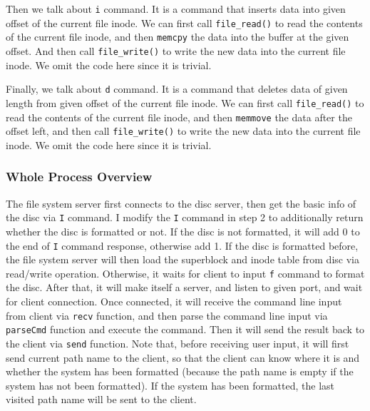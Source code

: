 Then we talk about \texttt{i} command. It is a command that inserts data into given offset of the current file inode. 
We can first call \texttt{file\_read()} to read the contents of the current file inode, and then \texttt{memcpy} the data into the buffer at the given offset. And then call \texttt{file\_write()} to write the new data into the current file inode. 
We omit the code here since it is trivial.

Finally, we talk about \texttt{d} command. It is a command that deletes data of given length from given offset of the current file inode.
We can first call \texttt{file\_read()} to read the contents of the current file inode, and then \texttt{memmove} the data after the offset left, and then call \texttt{file\_write()} to write the new data into the current file inode.
We omit the code here since it is trivial.

\subsubsection{Whole Process Overview}
The file system server first connects to the disc server, then get the basic info of the disc via \texttt{I} command. I modify the \texttt{I} command in step 2 to additionally return whether the disc is formatted or not.
If the disc is not formatted, it will add 0 to the end of \texttt{I} command response, otherwise add 1.
If the disc is formatted before, the file system server will then load the superblock and inode table from disc via read/write operation.
Otherwise, it waits for client to input \texttt{f} command to format the disc. After that, it will make itself a server, and listen to given port, and wait for client connection.
Once connected, it will receive the command line input from client via \texttt{recv} function, and then parse the command line input via \texttt{parseCmd} function and execute the command. Then it will send the result back to the client via \texttt{send} function. Note that, before receiving user input, 
it will first send current path name to the client, so that the client can know where it is and whether the system has been formatted (because the path name is empty if the system has not been formatted). If the system has been formatted, the last visited path name will be sent to the client.

